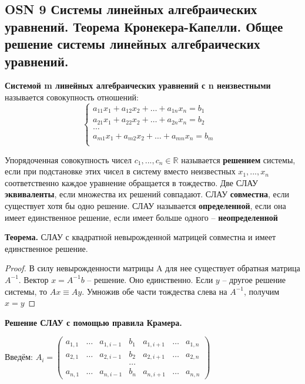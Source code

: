 \subsection{OSN 9 Системы линейных алгебраических уравнений. Теорема Кронекера-Капелли. Общее решение системы линейных алгебраических уравнений.}

\textbf{Системой m линейных алгебраических уравнений с n неизвестными} называется совокупность отношений:
    $$\begin{cases}
        a_{11}x_1 + a_{12}x_2+\dots+a_{1n}x_n = b_1&\\
        a_{21}x_1 + a_{22}x_2+\dots+a_{2n}x_n = b_2&\\
        \dots&\\
        a_{m1}x_1 + a_{m2}x_2+\dots+a_{mn}x_n = b_m&\\
    \end{cases}$$
    
Упорядоченная совокупность чисел $c_1, ..., c_n \in\mathbb{R}$ называется \textbf{решением} системы, если при подстановке этих чисел в систему вместо неизвестных $x_1, ..., x_n$ соответственно каждое уравнение обращается в тождество.
Две СЛАУ \textbf{эквиваленты}, если множества их решений совпадают.
СЛАУ \textbf{совместна}, если существует хотя бы одно решение.
СЛАУ называется \textbf{определенной}, если она имеет единственное решение, если имеет больше одного -- \textbf{неопределенной}


\textbf{Теорема.} СЛАУ с квадратной невырожденной матрицей совместна и имеет единственное решение.

\begin{proof}
В силу невырожденности матрицы A для нее существует обратная матрица $A^{-1}$.
Вектор $x = A^{-1}b$ -- решение. Оно единственно. Если $y$ -- другое решение системы, то $Ax \equiv Ay$. Умножив обе части тождества слева на $A^{-1}$, получим $x = y$
\end{proof}

\textbf{Решение СЛАУ с помощью правила Крамера.}

Введём:
$A_i = \begin{pmatrix} a_{1,1} & \dots & a_{1,i-1} & b_1 & a_{1,i+1} & \dots & a_{1,n} \\
           a_{2,1} & \dots & a_{2,i-1} & b_2 & a_{2,i+1} & \dots & a_{2,n} \\
            & & & \dots & & & \\
           a_{n,1} & \dots & a_{n,i-1} & b_n & a_{n,i+1} & \dots & a_{n,n}
\end{pmatrix}$

